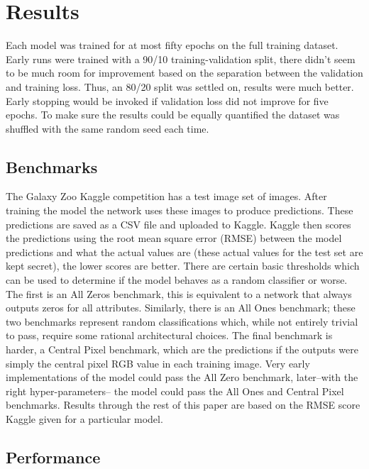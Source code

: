 \section{Results}


Each model was trained for at most fifty epochs on the full training dataset. Early runs were trained with a 90/10 training-validation split, there didn't seem to be much room for improvement based on the separation between the validation and training loss. Thus, an 80/20 split was settled on, results were much better. Early stopping would be invoked if validation loss did not improve for five epochs. To make sure the results could be equally quantified the dataset was shuffled with the same random seed each time.

\subsection{Benchmarks}\label{benchmarks}
The Galaxy Zoo Kaggle competition has a test image set of  images. After training the model the network uses these images to produce predictions. These predictions are saved as a CSV file and uploaded to Kaggle. Kaggle then scores the predictions using the root mean square error (RMSE) between the model predictions and what the actual values are (these actual values for the test set are kept secret), the lower scores are better. There are certain basic thresholds which can be used to determine if the model behaves as a random classifier or worse. The first is an All Zeros benchmark, this is equivalent to a network that always outputs zeros for all attributes. Similarly, there is an All Ones benchmark; these two benchmarks represent random classifications which, while not entirely trivial to pass, require some rational architectural choices. The final benchmark is harder, a Central Pixel benchmark, which are the predictions if the outputs were simply the central pixel RGB value in each training image. Very early implementations of the \vgg model could pass the All Zero benchmark, later--with the right hyper-parameters-- the model could pass the All Ones and Central Pixel benchmarks. Results through the rest of this paper are based on the RMSE score Kaggle given for a particular model.

\subsection{Performance}

